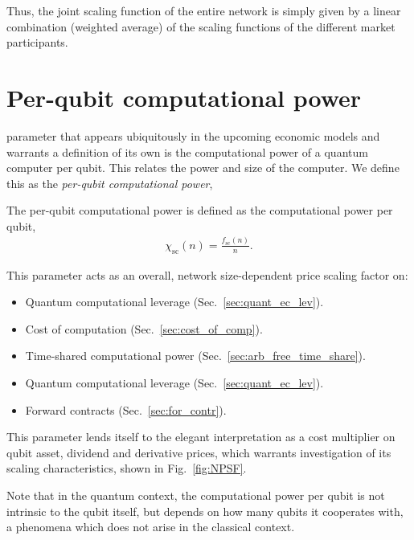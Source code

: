 Thus, the joint scaling function of the entire network is simply given by a linear combination (weighted average) of the scaling functions of the different market participants.

%
%

\section{Per-qubit computational power}\label{sec:NPSF}

 parameter that appears ubiquitously in the upcoming economic models and warrants a definition of its own is the computational power of a quantum computer per qubit. This relates the power and size of the computer. We define this as the \textit{per-qubit computational power},

\begin{definition}\label{def:NPSF}
The per-qubit computational power is defined as the computational power per qubit,
\begin{align}
\chi_\mathrm{sc}(n) = \frac{f_\mathrm{sc}(n)}{n}.
\end{align}
\end{definition}

This parameter acts as an overall, network size-dependent price scaling factor on:
\begin{itemize}
\item Quantum computational leverage (Sec.~\ref{sec:quant_ec_lev}).
\item Cost of computation (Sec.~\ref{sec:cost_of_comp}).
\item Time-shared computational power (Sec.~\ref{sec:arb_free_time_share}).
\item Quantum computational leverage (Sec.~\ref{sec:quant_ec_lev}).
\item Forward contracts (Sec.~\ref{sec:for_contr}).
\end{itemize}

This parameter lends itself to the elegant interpretation as a cost multiplier on qubit asset, dividend and derivative prices, which warrants investigation of its scaling characteristics, shown in Fig.~\ref{fig:NPSF}. 

Note that in the quantum context, the computational power per qubit is not intrinsic to the qubit itself, but depends on how many qubits it cooperates with, a phenomena which does not arise in the classical context.

